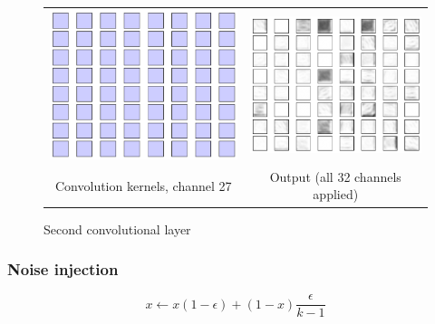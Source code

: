 \documentclass[a4paper, 11pt, table]{article}
\begin{document}
\begin{figure}[H]
\begin{tabular}{cc}
	\includegraphics[scale=0.4]{weight_decay/filters2.png} & \includegraphics[scale=0.4]{weight_decay/conv2.png} \\
	Convolution kernels, channel 27 & Output (all 32 channels applied) \\[6pt]

\end{tabular}
\caption{Second convolutional layer}
\end{figure}

\subsubsection{Noise injection}
\begin{equation}
\label{eq:soft_targets}
x \leftarrow x \left( 1 - \epsilon \right) + \left(1 - x\right) \frac{\epsilon}{k - 1}
\end{equation}
\end{document}
